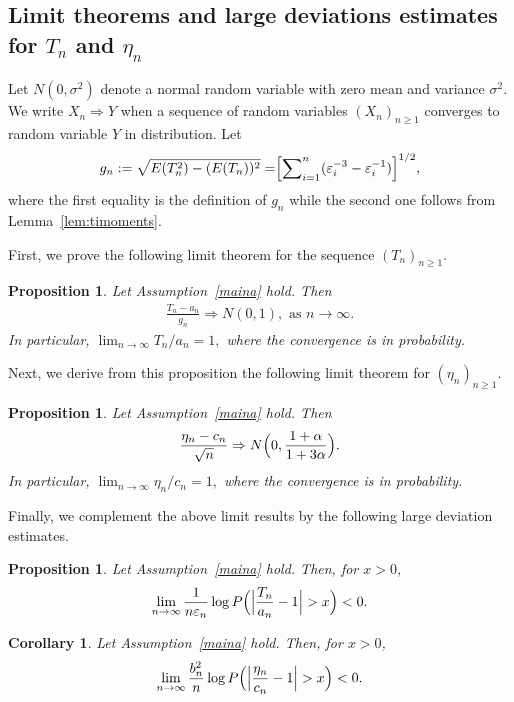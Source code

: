 \documentclass[12pt]{amsart}
\newtheorem{proposition}[theorem]{Proposition}
\newtheorem{corollary}[theorem]{Corollary}
\begin{document}
\subsection{Limit theorems and large deviations estimates
for $T_n$ and $\eta_n$} \label{sec:tnsub}
Let $N(0,\sigma^2)$ denote a normal random variable
with zero mean and variance $\sigma^2.$ We write $X_n\Rightarrow Y$ when
a sequence of random variables $(X_n)_{n\geq 1}$ converges to random variable
$Y$ in distribution. Let \begin{eqnarray}
\label{gin} g_n:=\sqrt{E(T_n^2)-(E(T_n))^2}=\Bigr[{\sum}_{i=1}^n
({\varepsilon}_i^{-3}- {\varepsilon}_i^{-1}) \Bigl]^{1/2},
\end{eqnarray}
where the first equality is the definition of $g_n$ while the second one follows from
Lemma~\ref{lem:timoments}.
\par
First, we prove the following limit theorem for the sequence $(T_n)_{n\geq 1}.$
\begin{proposition}
\label{tsuper} Let Assumption~\ref{maina} hold.
 Then
\begin{eqnarray*}
\frac {T_n -a_n}{g_n} \Rightarrow N(0,1),\mbox{ as }n\to\infty.
\end{eqnarray*}
In particular, $\lim_{n\to\infty} T_n /a_n =1,$ where the convergence is in probability.
\end{proposition}
Next, we derive from this proposition the following limit
theorem for $(\eta_n)_{n\ge 1}.$
\begin{proposition}
\label{cor} Let Assumption~\ref{maina} hold. Then \begin{eqnarray*} \frac{\eta_n
- c_n}{\sqrt{n} }\Rightarrow N\Bigl(0,
\frac{1+\alpha}{1+3\alpha}\Bigr).
\end{eqnarray*}
In particular, $\lim_{n\to\infty} \eta_n /c_n =1,$ where the convergence is in probability.
\end{proposition}
Finally, we complement the above limit results by the following large deviation estimates.
\begin{proposition}
\label{ldp} Let Assumption~\ref{maina} hold. Then, for $x>0$, \begin{eqnarray*}
\lim_{n\to\infty} \frac{1}{n{\varepsilon}_n} \log P\Bigl(
\Bigl|\frac{T_n}{a_n}-1\Bigr|>x\Bigr)<0. \end{eqnarray*}
\end{proposition}
\begin{corollary}
\label{ldpeta} Let Assumption~\ref{maina} hold. Then, for $x > 0$,
\begin{eqnarray*} \lim_{n\to\infty} \frac{b_n^2}{n} \log
P\Bigl(\Bigl|\frac{\eta_n}{c_n}-1\Bigr|>x\Bigr)<0. \end{eqnarray*}
\end{corollary}
\end{document}

